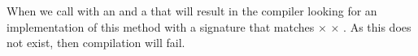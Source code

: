 \inputminted{csharp}{\context/answer/Adder.cs}

When we call  with an  and a  that will result in the compiler looking for an implementation of this method with a signature that matches  $\times$  $\times$ . As this does not exist, then compilation will fail.
